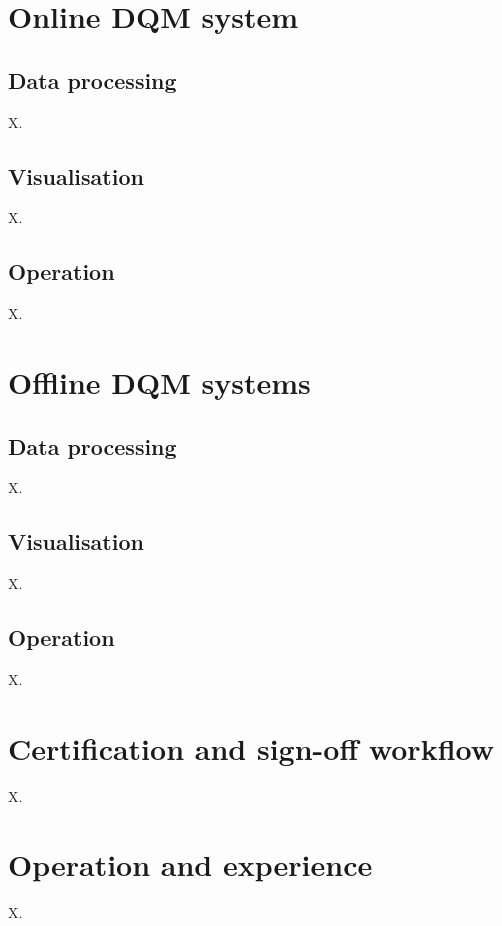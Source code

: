 \documentclass[a4paper]{jpconf}
\begin{document}
\section{Online DQM system}
\subsection{Data processing}
X.

\subsection{Visualisation}
X.

\subsection{Operation}
X.


\section{Offline DQM systems}
\subsection{Data processing}
X.

\subsection{Visualisation}
X.

\subsection{Operation}
X.


\section{Certification and sign-off workflow}
X.


\section{Operation and experience}
X.

\end{document}
